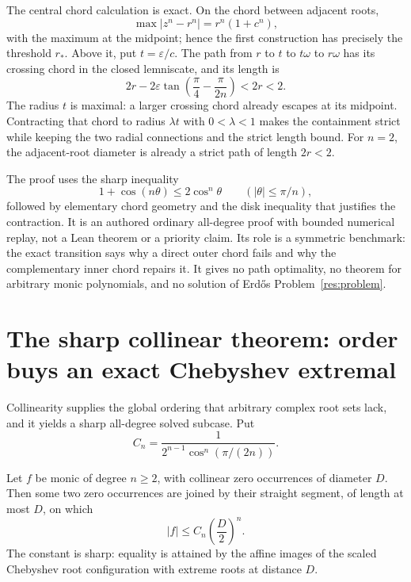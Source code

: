 \documentclass[11pt]{article}
\begin{document}
The central chord calculation is exact.  On the chord between adjacent roots,
\[
 \max |z^n-r^n|=r^n(1+c^n),
\]
with the maximum at the midpoint; hence the first construction has precisely
the threshold $r_*$.  Above it, put $t=\varepsilon/c$.  The path from $r$ to
$t$ to $t\omega$ to $r\omega$ has its crossing chord in the closed
lemniscate, and its length is
\[
 2r-2\varepsilon\tan\!\left(\frac\pi4-\frac\pi{2n}\right)<2r<2.
\]
The radius $t$ is maximal: a larger crossing chord already escapes at its
midpoint.  Contracting that chord to radius $\lambda t$ with $0<\lambda<1$
makes the containment strict while keeping the two radial connections and the
strict length bound.  For $n=2$, the adjacent-root diameter is already a
strict path of length $2r<2$.

The proof uses the sharp inequality
\[
  1+\cos(n\theta)\le2\cos^n\theta
  \qquad (|\theta|\le\pi/n),
\]
followed by elementary chord geometry and the disk inequality that justifies
the contraction.  It is an authored ordinary all-degree proof with bounded
numerical replay, not a Lean theorem or a priority claim.  Its role is a
symmetric benchmark: the exact transition says why a direct outer chord fails
and why the complementary inner chord repairs it.  It gives no path
optimality, no theorem for arbitrary monic polynomials, and no solution of
Erd\H{o}s Problem~\ref{res:problem}.

\section{The sharp collinear theorem: order buys an exact Chebyshev extremal}
\label{sec:collinear}

Collinearity supplies the global ordering that arbitrary complex root sets
lack, and it yields a sharp all-degree solved subcase.  Put
\[
 C_n=\frac{1}{2^{n-1}\cos^n(\pi/(2n))}.
\]

\begin{theorem}
\label{res:sharp-collinear-root-diameter}
Let $f$ be monic of degree $n\ge2$, with collinear zero occurrences of diameter
$D$.  Then some two zero occurrences are joined by their straight segment,
of length at most $D$, on which
\[
 |f|\le C_n\left(\frac D2\right)^n.
\]
The constant is sharp: equality is attained by the affine images of the
scaled Chebyshev root configuration with extreme roots at distance $D$.
\end{theorem}
\end{document}
